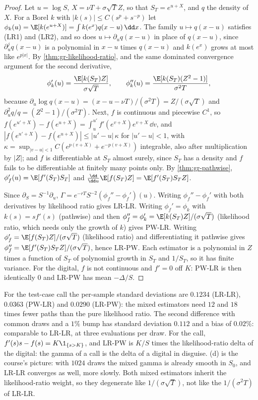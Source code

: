 \begin{proof}
Let $u=\log S$, $X=\nu T+\sigma\sqrt TZ$, so that $S_T=e^{u+X}$, and $q$ the density of $X$.
For a Borel $k$ with $|k(s)|\le C(s^p+s^{-p})$ let $\phi_k(u)=\E[k(e^{u+X})]=\int k(e^x)q(x-u)\,\dd x$.
The family $u\mapsto q(x-u)$ satisfies (LR1) and (LR2), and so does $u\mapsto\partial_uq(x-u)$ in
place of $q(x-u)$, since $\partial_u^jq(x-u)$ is a polynomial in $x-u$ times $q(x-u)$ and $k(e^x)$
grows at most like $e^{p|x|}$. By \cref{thm:gr-likelihood-ratio}, and the same dominated
convergence argument for the second derivative,
\[
  \phi_k'(u)=\frac{\E[k(S_T)Z]}{\sigma\sqrt T},\qquad \phi_k''(u)=\frac{\E[k(S_T)(Z^2-1)]}{\sigma^2T},
\]
because $\partial_u\log q(x-u)=(x-u-\nu T)/(\sigma^2T)=Z/(\sigma\sqrt T)$ and
$\partial_u^2q/q=(Z^2-1)/(\sigma^2T)$. Next, $f$ is continuous and piecewise $C^1$, so
$f(e^{u'+X})-f(e^{u+X})=\int_u^{u'}f'(e^{v+X})e^{v+X}\,\dd v$, and
$|f(e^{u'+X})-f(e^{u+X})|\le|u'-u|\,\kappa$ for $|u'-u|<1$, with
$\kappa=\sup_{|v-u|<1}C(e^{p(v+X)}+e^{-p(v+X)})$ integrable, also after multiplication by $|Z|$;
and $f$ is differentiable at $S_T$ almost surely, since $S_T$ has a density and $f$ fails to be
differentiable at finitely many points only. By \cref{thm:gr-pathwise},
$\phi_f'(u)=\E[f'(S_T)S_T]$ and $\frac{\dd}{\dd u}\E[f(S_T)Z]=\E[f'(S_T)S_TZ]$.

Since $\partial_S=S^{-1}\partial_u$, $\Gamma=e^{-rT}S^{-2}(\phi_f''-\phi_f')(u)$. Writing
$\phi_f''-\phi_f'$ with both derivatives by likelihood ratio gives LR-LR. Writing
$\phi_f'=\phi_k$ with $k(s)=sf'(s)$ (pathwise) and then
$\phi_f''=\phi_k'=\E[k(S_T)Z]/(\sigma\sqrt T)$ (likelihood ratio, which needs only the growth
of $k$) gives PW-LR. Writing $\phi_f'=\E[f(S_T)Z]/(\sigma\sqrt T)$ (likelihood ratio) and
differentiating it pathwise gives $\phi_f''=\E[f'(S_T)S_TZ]/(\sigma\sqrt T)$, hence LR-PW. Each
estimator is a polynomial in $Z$ times a function of $S_T$ of polynomial growth in $S_T$ and
$1/S_T$, so it has finite variance. For the digital, $f$ is not continuous and $f'=0$ off $K$:
PW-LR is then identically $0$ and LR-PW has mean $-\Delta/S$.
\end{proof}

For the test-case call the per-sample standard deviations are $0.1234$ (LR-LR), $0.0363$
(PW-LR) and $0.0290$ (LR-PW): the mixed estimators need $12$ and $18$ times fewer paths than
the pure likelihood ratio. The second difference with common draws and a $1\%$ bump has standard
deviation $0.112$ and a bias of $0.02\%$: comparable to LR-LR, at three evaluations per draw. For the call,
$f'(s)s-f(s)=K\1_{\{s>K\}}$, and LR-PW is $K/S$ times the likelihood-ratio delta of the digital:
the gamma of a call is the delta of a digital in disguise. (d) is the
course's picture: with $1024$ draws the mixed gamma is already smooth in $S_0$, and LR-LR
converges as well, more slowly. Both mixed estimators inherit the likelihood-ratio weight, so
they degenerate like $1/(\sigma\sqrt T)$, not like the $1/(\sigma^2T)$ of LR-LR.

